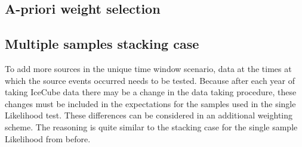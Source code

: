 \subsection{A-priori weight selection}

\subsection{Multiple samples stacking case}
To add more sources in the unique time window scenario, data at the times at which the source events occurred needs to be tested.
Because after each year of taking IceCube data there may be a change in the data taking procedure, these changes must be included in the expectations for the samples used in the single Likelihood test.
These differences can be considered in an additional weighting scheme.
The reasoning is quite similar to the stacking case for the single sample Likelihood from before.


